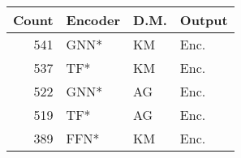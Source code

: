 \begin{tabular}{rlll}
\toprule
Count & Encoder & D.M. & Output \\
\midrule
541 & GNN* & KM & Enc. \\
537 & TF* & KM & Enc. \\
522 & GNN* & AG & Enc. \\
519 & TF* & AG & Enc. \\
389 & FFN* & KM & Enc. \\
\bottomrule
\end{tabular}
